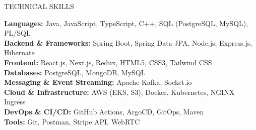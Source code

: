\documentclass{resume} %
\begin{document}
\begin{rSection}{TECHNICAL SKILLS}
    \vspace{-0.5em}

    \textbf{Languages:} Java, JavaScript, TypeScript, C++, SQL (PostgreSQL, MySQL), PL/SQL \\[0.3em]
    \textbf{Backend \& Frameworks:} Spring Boot, Spring Data JPA, Node.js, Express.js, Hibernate \\[0.3em]
    \textbf{Frontend:} React.js, Next.js, Redux, HTML5, CSS3, Tailwind CSS \\[0.3em]
    \textbf{Databases:} PostgreSQL, MongoDB, MySQL \\[0.3em]
    \textbf{Messaging \& Event Streaming:} Apache Kafka, Socket.io \\[0.3em]
    \textbf{Cloud \& Infrastructure:} AWS (EKS, S3), Docker, Kubernetes, NGINX Ingress \\[0.3em]
    \textbf{DevOps \& CI/CD:} GitHub Actions, ArgoCD, GitOps, Maven \\[0.3em]
    \textbf{Tools:} Git, Postman, Stripe API, WebRTC

\end{rSection}
\end{document}

